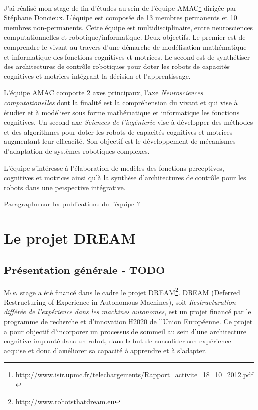 \documentclass[draft]{llncs}
\begin{document}
J'ai réalisé mon stage de fin d'études au sein de l'équipe AMAC\footnote{http://www.isir.upmc.fr/telechargements/Rapport\_activite\_18\_10\_2012.pdf} dirigée par Stéphane Doncieux.
L'équipe est composée de 13 membres permanents et 10 membres non-permanents.
Cette équipe est multidisciplinaire, entre neurosciences computationnelles et robotique/informatique.
Deux objectifs. 
Le premier est de comprendre le vivant au travers d’une démarche de modélisation mathématique et informatique des fonctions cognitives et motrices.
Le second est de synthétiser des architectures de contrôle robotiques pour doter les robots de capacités cognitives et motrices intégrant la décision et l’apprentissage.

L'équipe AMAC comporte 2 axes principaux, l'axe \textit{Neurosciences computationelles} dont la finalité est la compréhension du vivant et qui vise à étudier et à modéliser sous forme mathématique et informatique les fonctions cognitives.
Un second axe \textit{Sciences de l'ingénierie} vise à développer des méthodes et des algorithmes pour doter les robots de capacités cognitives et motrices augmentant leur efficacité. Son objectif est le développement de mécanismes d'adaptation de systèmes robotiques complexes.
 
L’équipe s’intéresse à l’élaboration de modèles des fonctions perceptives, cognitives et motrices ainsi qu’à la synthèse d’architectures de contrôle pour les robots dans une perspective intégrative.


Paragraphe sur les publications de l'équipe ?



\section{Le projet DREAM}

\subsection{Présentation générale - TODO}

\lettrine{M}{on} stage a été financé dans le cadre le projet DREAM\footnote{http://www.robotsthatdream.eu}.
DREAM (Deferred Restructuring of Experience in Autonomous Machines), soit \textit{Restructuration différée de l'expérience dans les machines autonomes}, est un projet financé par le programme de recherche et d'innovation H2020 de l'Union Européenne.
Ce projet a pour objectif d'incorporer un processus de sommeil au sein d'une architecture cognitive implanté dans un robot, dans le but de consolider son expérience acquise et donc d'améliorer sa capacité à apprendre et à s'adapter.
\end{document}

